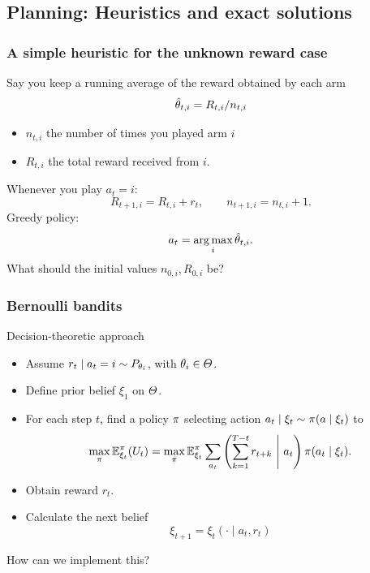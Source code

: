 \documentclass[9pt]{beamer}
\begin{document}
\subsection{Planning: Heuristics and exact solutions}
\label{sec:exp-design-bandit}


\begin{frame}
  \frametitle{A simple heuristic for the unknown reward case}
  Say you keep a \alert{running average} of the reward obtained by each arm
  \[
  \hat{\theta}_{t,i} = R_{t,i} / n_{t,i}
  \]
  \begin{itemize}
  \item $n_{t,i}$ the number of times you played arm $i$ 
  \item $R_{t,i}$ the total reward received from $i$.
  \end{itemize}
  Whenever you play $a_t = i$:
  \[
  R_{t+1, i} = R_{t,i} + r_t, \qquad n_{t+1,i} = n_{t,i} + 1.
  \]
  Greedy policy:
  \[
  a_t = \mathop{\rm arg\,max}_i \hat{\theta}_{t,i}.
  \]
  What should the initial values $n_{0,i}, R_{0,i}$ be?
\end{frame}


\begin{frame}
  \frametitle{Bernoulli bandits}
  \begin{block}{Decision-theoretic approach}
    \begin{itemize}
    \item Assume $r_t \mid a_t = i \sim P_{\theta_i}$, with $\theta_i\in \Theta$.
    \item Define prior belief  $\xi_1$ on $\Theta$.
    \item For each step $t$, find a policy $\pi$ selecting action $a_t \mid \xi_t \sim \pi(a \mid \xi_t)$ to 
      \[
      \max_\pi \mathop{\mbox{\ensuremath{\mathbb{E}}}}\nolimits^\pi_{\xi_t}(U_t) = \max_\pi \mathop{\mbox{\ensuremath{\mathbb{E}}}}\nolimits^\pi_{\xi_t} \sum_{a_t} \left(\sum_{k=1}^{T-t}  r_{t+k} ~\middle|~ a_t \right) \pi(a_t \mid \xi_t).
      \]
    \item Obtain reward $r_t$.
    \item Calculate the next belief
      \[
        \xi_{t+1} = \xi_t(\cdot \mid a_t, r_t)
      \]
    \end{itemize}
  \end{block}
  How can we implement this?
\end{frame}
\end{document}
